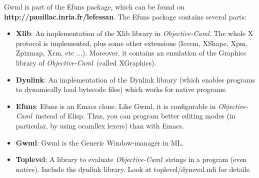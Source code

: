 \documentclass{book}
\newcommand{\ocaml}{\emph{Objective-Caml}}
\begin{document}
  Gwml is part of the Efuns package, which can be found on 
{\bf http://pauillac.inria.fr/\~lefessan}. The Efuns package contains 
several parts:
\begin{itemize}
\item {\bf Xlib}: An implementation of the Xlib library in \ocaml.
  The whole X protocol is implemented, plus some other extensions (Icccm,
  XShape, Xpm, Zpixmap, Xrm, etc ...). Moreover, it contains an emulation
  of the Graphics library of \ocaml~(called XGraphics).
\item {\bf Dynlink}: An implementation of the Dynlink library (which 
enables programs to dynamically load bytecode files) which works for 
native programs.

\item {\bf Efuns}: Efuns is an Emacs clone. Like Gwml, it is configurable in
\ocaml~instead of Elisp. Thus, you can program better editing modes (in 
particular, by using ocamllex lexers) than with Emacs.

\item {\bf Gwml}: Gwml is the Generic Window-manager in ML.

\item{\bf Toplevel}: A library to evaluate \ocaml~strings in a program
 (even native). Include the dynlink library. Look at toplevel/dyneval.mli
  for details.

\end{itemize}
\end{document}

